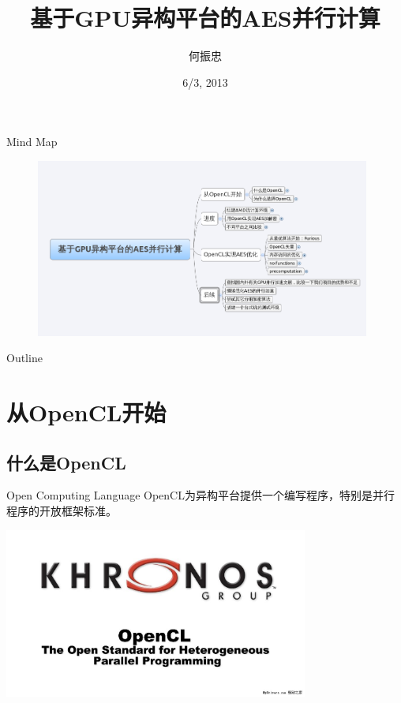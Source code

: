 \documentclass{beamer}
\title[AES Parallel Computing]
{基于GPU异构平台的AES并行计算}
\author[Edwin Ho] %
{何振忠}
\institute[South China Normal University(SCNU)] %
{
  School of Computer\\
  South China Normal University
}
\date[WABI 2013]
{6/3, 2013}
\begin{document}
\begin{frame}
  \titlepage
\end{frame}

\begin{frame}{Mind Map}
  \begin{figure}
    \raggedright
    \includegraphics[width=11cm]{mindmap.png}
  \end{figure}
\end{frame}

\begin{frame}{Outline}
  \tableofcontents
\end{frame}

\section{从OpenCL开始}

\subsection{什么是OpenCL}

\begin{frame}{Open Computing Language}
    OpenCL为异构平台提供一个编写程序，特别是并行程序的开放框架标准。\\
    \begin{center}
    \includegraphics[width=10cm]{Khronos.png}
    \end{center}
\end{frame}
\end{document}
